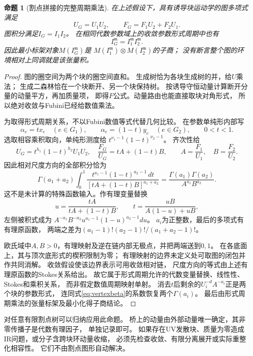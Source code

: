\documentclass[11pt,a4paper]{ctexart}
\theoremstyle{cnplain}\newtheorem{theorem}{定理}[section]
\newtheorem{proposition}[theorem]{命题}
\theoremstyle{definition}\newtheorem{definition}[theorem]{定义}
\theoremstyle{remark}\newtheorem{remark}[theorem]{注}
\begin{document}
\begin{proposition}[割点拼接的完整周期乘法]\label{prop:vertexproduct}
在上述假设下，具有诱导块运动学的图多项式满足
\[
 U_G=U_1U_2,\qquad F_G=F_1U_2+F_2U_1 .
\]
图积分满足$I_G=I_1I_2$。
在相同代数参数域上的收敛参数形式周期中也有
\[
 I_G^{\mathfrak m}=I_1^{\mathfrak m}I_2^{\mathfrak m}.
\]
因此最小标架对象$M(I_G^{\mathfrak m})$是
$M(I_1^{\mathfrak m})\otimes M(I_2^{\mathfrak m})$的子商；
没有断言整个图的环境相对上同调就是该张量积。
\end{proposition}
\begin{proof}
图的圈空间为两个块的圈空间直和。
生成树恰为各块生成树的并，给$U$乘法；
生成二森林恰在一个块断开、另一个块保持树。
按诱导守恒动量计算断开分量的动量平方，再加质量项，
即得$F$公式。动量路由也能直接取块对角形式，
所以绝对收敛与Fubini已经给数值乘法。

为取得形式周期关系，不以Fubini数值等式代替几何比较。
在参数单纯形内部写
\[
 \alpha_e=t x_e\quad(e\in G_1),\qquad
 \alpha_e=(1-t)y_e\quad(e\in G_2),\qquad 0<t<1 .
\]
选取相容乘积取向，单纯形测度给
$t^{\nu_1-1}(1-t)^{\nu_2-1}$。
齐次性给
\[
 U_G=t^{h_1}(1-t)^{h_2}U_1U_2,\quad
 \frac{F_G}{U_G}=tA+(1-t)B,\qquad A=\frac{F_1}{U_1},\quad B=\frac{F_2}{U_2}.
\]
因此相对尺度方向的全部积分恰为
\begin{equation}\label{eq:vertexbeta}
 \Gamma(a_1+a_2)\int_0^1
 \frac{t^{a_1-1}(1-t)^{a_2-1}\,dt}
      {[tA+(1-t)B]^{a_1+a_2}}
 =\frac{\Gamma(a_1)\Gamma(a_2)}{A^{a_1}B^{a_2}} .
\end{equation}
这不是未计算的特殊函数输入。作有理变量替换
\[
 u=\frac{tA}{tA+(1-t)B},\qquad
 t=\frac{uB}{A(1-u)+uB},
\]
左侧被积式成为
$A^{-a_1}B^{-a_2}u^{a_1-1}(1-u)^{a_2-1}du$。
$a_i$为正整数，最后的多项式有有理原函数，
两端之差为$(a_1-1)!(a_2-1)!/(a_1+a_2-1)!$。

欧氏域中$A,B>0$，有理映射及逆在链内部无极点，并把两端送到$0,1$。
在各底面上，其与顶次底形式的楔积限制为零；
有理映射的边界未定义处可取图的闭包并作共同消解。
收敛假设使该边界表示可用收敛相对链，
尺度方向的等式由上述有理原函数的Stokes关系给出。
故它属于形式周期允许的代数变量替换、线性性、Stokes和乘积关系，
而非假定数值周期映射单射。
消去$t$后剩余的$U_i^{-d}A^{-a_i}$正是两个块的参数形式，
连同式\eqref{eq:vertexbeta}的系数恢复两个$\Gamma(a_i)$。
最后由形式周期乘法的张量标架及最小化得子商结论。
\end{proof}

对任意有限割点树可以归纳应用此命题。
桥上的动量由外部动量唯一确定，其非零传播子是代数有理因子，
单独记录即可。
如果存在UV发散块、质量为零造成IR问题，或分子含跨块环动量收缩，
必须先检查收敛、有限分离展开或实际重整化相容性。
它们不由割点图形自动解决。
\end{document}
